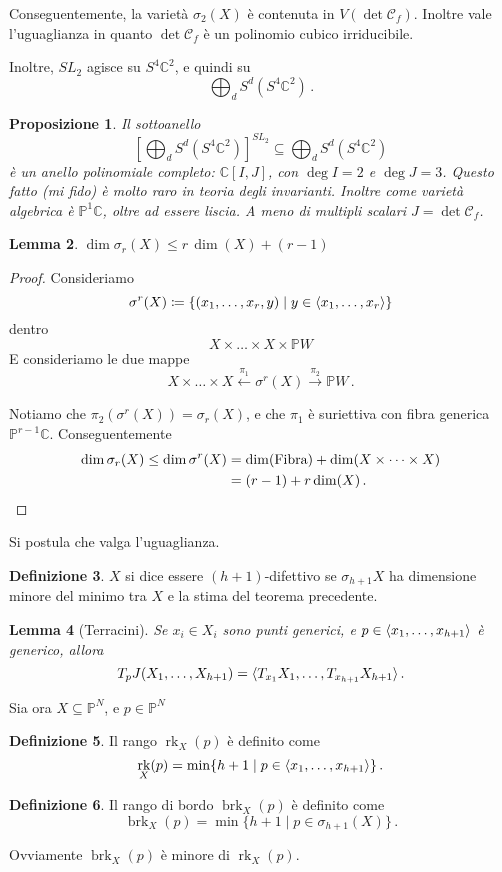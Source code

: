 \documentclass[a4paper, 11pt]{article}
\theoremstyle{definition}
\newtheorem{Def}{Definizione}[section]
\theoremstyle{plain}
\newtheorem{Lemma}[Def]{Lemma}
\newtheorem{Prop}[Def]{Proposizione}
\DeclarePairedDelimiter{\ang}{\langle}{\rangle}
\newcommand{\PP}{\mathbb{P}}
\newcommand{\C}{\mathbb{C}}
\newcommand{\deff}{\coloneqq}
\newcommand{\CC}{\mathcal{C}}
\DeclareMathOperator{\rk}{rk}
\DeclareMathOperator{\brk}{brk}
\begin{document}
Conseguentemente, la varietà $\sigma_2(X)$ è contenuta in $V(\det \CC_f)$. Inoltre vale l'uguaglianza in quanto $\det \CC_f$ è un polinomio cubico irriducibile.

Inoltre, $SL_2$ agisce su $S^4\C^2$, e quindi su 
\[
	\bigoplus_d S^d(S^4\C^2)\,.
\]
\begin{Prop}
	Il sottoanello
	\[
		\left[\bigoplus_d S^d(S^4\C^2)\right]^{SL_2} \subseteq \bigoplus_d S^d(S^4\C^2)
	\]
	è un anello polinomiale completo: $\C[I,J]$, con $\deg I = 2$ e $\deg J = 3$. Questo fatto (mi fido) è molto raro in teoria degli invarianti. Inoltre come varietà algebrica è $\PP^1\C$, oltre ad essere liscia. A meno di multipli scalari $J = \det \CC_f$. 
\end{Prop}

\begin{Lemma}
	$\dim \sigma_r(X) \le r\,\dim(X) + (r-1)$
\end{Lemma}
\begin{proof}
	Consideriamo 
	\[
		\sigma^r(X) \deff \{(x_1, \dots, x_r, y) \mid y \in \ang{x_1, \dots, x_r}\}
	\]
	dentro 
	\[
		X \times\dots\times X\times \PP W
	\]
	E consideriamo le due mappe
	\[
		X \times\dots\times X \overset{\pi_1}{\longleftarrow} \sigma^r(X) \overset{\pi_2}{\longrightarrow} \PP W \,.
	\]
	
	Notiamo che $\pi_2(\sigma^r(X)) = \sigma_r(X)$, e che $\pi_1$ è suriettiva con fibra generica $\PP^{r-1}\C$. Conseguentemente
	\[
	\begin{split}
			\dim \sigma_r(X) \le \dim \sigma^r(X) &= \dim(\text{Fibra}) + \dim(X \times\dots\times X) \\
			&= (r-1) + r\dim(X)\,. \qedhere
	\end{split}
	\]
\end{proof}
Si postula che valga l'uguaglianza.

\begin{Def}
	$X$ si dice essere $(h+1)$-difettivo se $\sigma_{h+1} X $ ha dimensione minore del minimo tra $X$ e la stima del teorema precedente.
\end{Def}
\begin{Lemma}[Terracini]
	Se $x_i \in X_i$ sono punti generici, e $p \in \ang{x_1, \dots, x_{h+1}}$ è generico, allora
	\[
		T_pJ(X_1, \dots, X_{h+1}) = \ang{T_{x_1}X_1, \dots, T_{x_{h+1}}X_{h+1}}\,.
	\]
\end{Lemma}

Sia ora $X \subseteq \PP^N$, e $p \in \PP^N$
\begin{Def}
	Il rango $\rk_X(p)$ è definito come
	\[
		\rk_X(p) = \min\{h+1 \mid p \in \ang{x_1, \dots, x_{h+1}}\}\,.
	\]
\end{Def}
\begin{Def}
Il rango di bordo $\brk_X(p)$ è definito come
\[
\brk_X(p) = \min\{h+1 \mid p \in \sigma_{h+1}(X)\}\,.
\]
\end{Def}
Ovviamente $\brk_X(p)$ è minore di $\rk_X(p)$.
\end{document}
